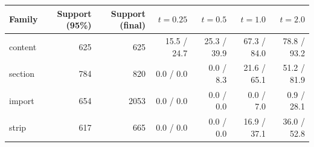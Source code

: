 \begin{tabular}{lrrrrrr}
\toprule
Family & Support (95\%) & Support (final) & $t=0.25$ & $t=0.5$ & $t=1.0$ & $t=2.0$ \\
\midrule
content & 625 & 625 & 15.5 / 24.7 & 25.3 / 39.9 & 67.3 / 84.0 & 78.8 / 93.2 \\
section & 784 & 820 & 0.0 / 0.0 & 0.0 / 8.3 & 21.6 / 65.1 & 51.2 / 81.9 \\
import & 654 & 2053 & 0.0 / 0.0 & 0.0 / 0.0 & 0.0 / 7.0 & 0.9 / 28.1 \\
strip & 617 & 665 & 0.0 / 0.0 & 0.0 / 0.0 & 16.9 / 37.1 & 36.0 / 52.8 \\
\bottomrule
\end{tabular}
